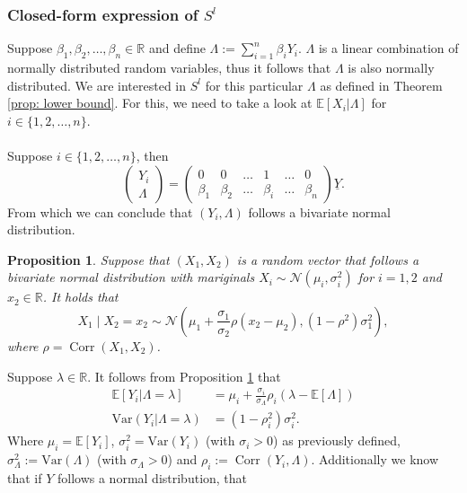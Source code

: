 \documentclass{article}
\newtheorem{proposition}{Proposition}
\DeclareMathOperator{\Corr}{Corr}
\begin{document}
\subsubsection{Closed-form expression of $S^l$}
Suppose $\beta_1,\beta_2,\dots,\beta_n\in \mathbb{R}$ and define $\Lambda :=\sum_{i=1}^n\beta_iY_i$. $\Lambda$ is a linear combination of normally distributed random variables, thus it follows that $\Lambda$ is also normally distributed. We are interested in $S^l$ for this particular $\Lambda$ as defined in Theorem \ref{prop: lower bound}. For this, we need to take a look at $\mathbb{E}[X_i|\Lambda]$ for $i\in \{1,2,\dots,n\}$.
\\\\
Suppose $i\in \{1,2,\dots,n\}$, then
\begin{equation*}
    \begin{pmatrix}
        Y_i\\
        \Lambda
    \end{pmatrix}
    = \begin{pmatrix}
        0&0&\dots&1&\dots&0\\
        \beta_1&\beta_2&\dots&\beta_i&\dots&\beta_n
    \end{pmatrix}
    \underline{Y}.
\end{equation*}
From which we can conclude that $(Y_i,\Lambda)$ follows a bivariate normal distribution. 
\begin{proposition}\cite[Theorem 4.4d]{rencher-2007}\label{prop: conditional normal distributions}
    Suppose that $(X_1,X_2)$ is a random vector that follows a bivariate normal distribution with mariginals $X_i\sim \mathcal{N}(\mu_i,\sigma_i^2)$ for $i = 1,2$ and $x_2\in \mathbb{R}$. It holds that 
    \begin{equation}X_1 \mid X_2=x_2 \sim \mathcal{N}\left(\mu_1+\frac{\sigma_1}{\sigma_2}\rho(x_2 - \mu_2),(1-\rho^2)\sigma_1^2\right),
    \end{equation}
    where $\rho = \Corr(X_1,X_2)$.
\end{proposition}
Suppose $\lambda\in \mathbb{R}$. It follows from Proposition \ref{prop: conditional normal distributions} that 
\begin{align*} 
\mathbb{E}[Y_i|\Lambda = \lambda] &= \mu_i + \frac{\sigma_i}{\sigma_\Lambda}\rho_i(\lambda - \mathbb{E}[\Lambda])\\
\text{Var}(Y_i | \Lambda = \lambda) &= (1-\rho_i^2)\sigma_i^2.
\end{align*}
Where $\mu_i = \mathbb{E}[Y_i]$, $\sigma_i^2 = \text{Var}(Y_i)$ (with $\sigma_i > 0$) as previously defined, $\sigma_\Lambda^2 := \text{Var}(\Lambda)$ (with $\sigma_\Lambda > 0$) and $\rho_i := \Corr(Y_i,\Lambda)$. Additionally we know that if $Y$ follows a normal distribution, that
\end{document}
